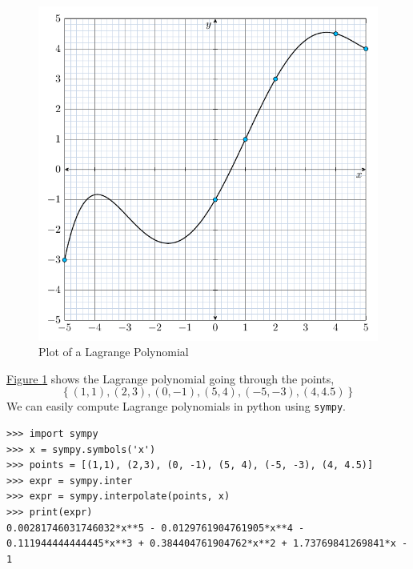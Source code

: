 \documentclass[11pt,numbers=noenddot,svgnames]{scrbook}
\begin{document}
\begin{figure}[H]
\centering
\includegraphics[scale=0.75]{figures/lagrange_poly_plot1.pdf}
\caption{Plot of a Lagrange Polynomial}
\label{fig:lagrange_poly_plot1}
\end{figure}

\hyperref[fig:lagrange_poly_plot1]{Figure \ref{fig:lagrange_poly_plot1}} shows the Lagrange polynomial going through 
the points, 
\[ \left\{(1,1), (2,3), (0, -1), (5, 4), (-5, -3), (4, 4.5) \right\}\] 
We can easily compute Lagrange polynomials in python using \texttt{sympy}.

\begin{mdcode}
\begin{verbatim}
>>> import sympy
>>> x = sympy.symbols('x')
>>> points = [(1,1), (2,3), (0, -1), (5, 4), (-5, -3), (4, 4.5)]
>>> expr = sympy.inter
>>> expr = sympy.interpolate(points, x)
>>> print(expr)
0.00281746031746032*x**5 - 0.0129761904761905*x**4 - 0.111944444444445*x**3 + 0.384404761904762*x**2 + 1.73769841269841*x - 1
\end{verbatim}
\end{mdcode}
\end{document}
